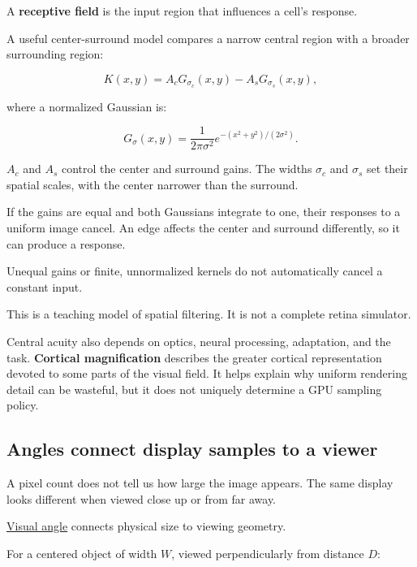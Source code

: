 \hypertarget{04-visual-computing-ii-ch042-why-a-uniform-patch-and-an-edge-produce-different-responses}{}

A \textbf{receptive field} is the input region that influences a cell's response.

A useful center-surround model compares a narrow central region with a broader surrounding region:

\[
K(x,y)=A_cG_{\sigma_c}(x,y)-A_sG_{\sigma_s}(x,y),
\]

where a normalized Gaussian is:

\[
G_\sigma(x,y)=
\frac{1}{2\pi\sigma^2}
e^{-(x^2+y^2)/(2\sigma^2)}.
\]

\(A_c\) and \(A_s\) control the center and surround gains. The widths \(\sigma_c\) and \(\sigma_s\) set their spatial scales, with the center narrower than the surround.

If the gains are equal and both Gaussians integrate to one, their responses to a uniform image cancel. An edge affects the center and surround differently, so it can produce a response.

Unequal gains or finite, unnormalized kernels do not automatically cancel a constant input.

This is a teaching model of spatial filtering. It is not a complete retina simulator.

Central acuity also depends on optics, neural processing, adaptation, and the task. \textbf{Cortical magnification} describes the greater cortical representation devoted to some parts of the visual field. It helps explain why uniform rendering detail can be wasteful, but it does not uniquely determine a GPU sampling policy.

\subsection{Angles connect display samples to a viewer}\label{04-visual-computing-ii-ch042-angles-connect-display-samples-to-a-viewer}

\hypertarget{04-visual-computing-ii-ch042-angles-connect-display-samples-to-a-viewer}{}

A pixel count does not tell us how large the image appears. The same display looks different when viewed close up or from far away.

\hyperref[appendix-7d356c396d1a]{Visual angle} connects physical size to viewing geometry.

For a centered object of width \(W\), viewed perpendicularly from distance \(D\):

